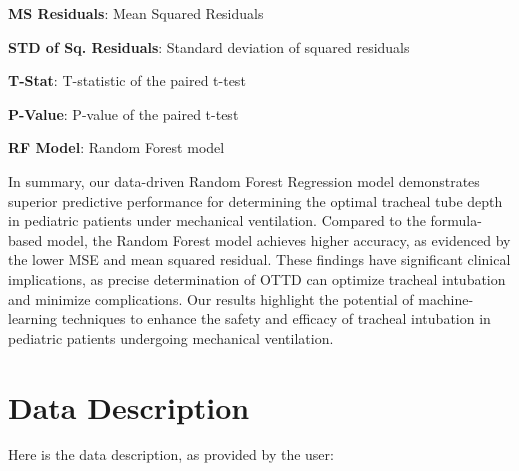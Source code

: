 \documentclass[11pt]{article}
\begin{document}
\begin{table}[h]
\caption{Hypothesis Testing: Comparing The Mean Squared Residuals of Random Forest Model and Formula-Based Model}
\label{table:hypothesis_testing}
\begin{threeparttable}
\renewcommand{\TPTminimum}{\linewidth}
\begin{tablenotes}
\footnotesize
\item \textbf{MS Residuals}: Mean Squared Residuals
\item \textbf{STD of Sq. Residuals}: Standard deviation of squared residuals
\item \textbf{T-Stat}: T-statistic of the paired t-test
\item \textbf{P-Value}: P-value of the paired t-test
\item \textbf{RF Model}: Random Forest model
\end{tablenotes}
\end{threeparttable}
\end{table}


In summary, our data-driven Random Forest Regression model demonstrates superior predictive performance for determining the optimal tracheal tube depth in pediatric patients under mechanical ventilation. Compared to the formula-based model, the Random Forest model achieves higher accuracy, as evidenced by the lower MSE and mean squared residual. These findings have significant clinical implications, as precise determination of OTTD can optimize tracheal intubation and minimize complications. Our results highlight the potential of machine-learning techniques to enhance the safety and efficacy of tracheal intubation in pediatric patients undergoing mechanical ventilation.


\clearpage
\appendix

\section{Data Description} \label{sec:data_description} Here is the data description, as provided by the user:
\end{document}
